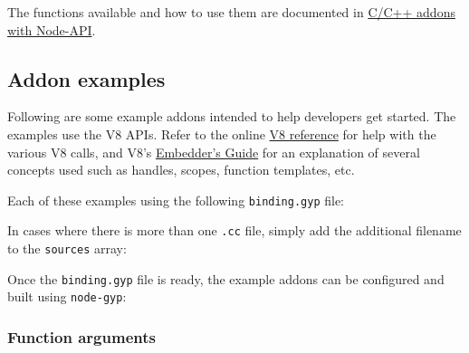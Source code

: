 The functions available and how to use them are documented in
\href{n-api.md}{C/C++ addons with Node-API}.

\subsection{Addon examples}\label{addon-examples}

Following are some example addons intended to help developers get
started. The examples use the V8 APIs. Refer to the online
\href{https://v8docs.nodesource.com/}{V8 reference} for help with the
various V8 calls, and V8's \href{https://v8.dev/docs/embed}{Embedder's
Guide} for an explanation of several concepts used such as handles,
scopes, function templates, etc.

Each of these examples using the following \texttt{binding.gyp} file:

\begin{Shaded}
\begin{Highlighting}[]
\FunctionTok{\{}
  \FunctionTok{:} \OtherTok{[}
    \FunctionTok{\{}
      \FunctionTok{:} \FunctionTok{,}
      \FunctionTok{:} \OtherTok{[}  \OtherTok{]}
    \FunctionTok{\}}
  \OtherTok{]}
\FunctionTok{\}}
\end{Highlighting}
\end{Shaded}

In cases where there is more than one \texttt{.cc} file, simply add the
additional filename to the \texttt{sources} array:

\begin{Shaded}
\begin{Highlighting}[]
 \OtherTok{[}\OtherTok{,} \OtherTok{]}
\end{Highlighting}
\end{Shaded}

Once the \texttt{binding.gyp} file is ready, the example addons can be
configured and built using \texttt{node-gyp}:

\begin{Shaded}
\begin{Highlighting}[]
\end{Highlighting}
\end{Shaded}

\subsubsection{Function arguments}\label{function-arguments}

